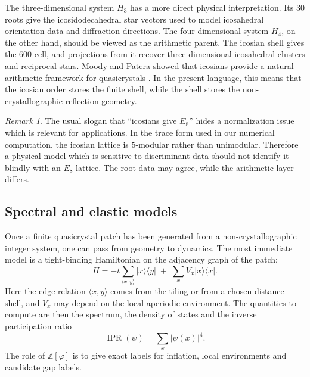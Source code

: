 \documentclass[12pt,oneside,english]{amsart}
\numberwithin{equation}{section}
\numberwithin{figure}{section}
\numberwithin{table}{section}
\theoremstyle{plain}
\theoremstyle{definition}
\theoremstyle{remark}
\newtheorem{remark}[theorem]{Remark}
\newcommand{\Zphi}{\mathbb Z[\varphi]}
\begin{document}
The three-dimensional system \(H_3\) has a more direct physical interpretation. Its \(30\) roots give the icosidodecahedral star vectors used to model icosahedral orientation data and diffraction directions. The four-dimensional system \(H_4\), on the other hand, should be viewed as the arithmetic parent. The icosian shell gives the \(600\)-cell, and projections from it recover three-dimensional icosahedral clusters and reciprocal stars. Moody and Patera showed that icosians provide a natural arithmetic framework for quasicrystals \cite{Icosians}. In the present language, this means that the icosian order stores the finite shell, while the shell stores the non-crystallographic reflection geometry.

\begin{remark}
The usual slogan that ``icosians give \(E_8\)'' hides a normalization issue which is relevant for applications. In the trace form used in our numerical computation, the icosian lattice is \(5\)-modular rather than unimodular. Therefore a physical model which is sensitive to discriminant data should not identify it blindly with an \(E_8\) lattice. The root data may agree, while the arithmetic layer differs.
\end{remark}

\subsection{Spectral and elastic models}

Once a finite quasicrystal patch has been generated from a non-crystallographic integer system, one can pass from geometry to dynamics. The most immediate model is a tight-binding Hamiltonian on the adjacency graph of the patch:
\begin{equation}
H=-t\sum_{\langle x,y\rangle}|x\rangle\langle y|
\;+\;\sum_x V_x |x\rangle\langle x|.
\label{eq:tight-binding}
\end{equation}
Here the edge relation \(\langle x,y\rangle\) comes from the tiling or from a chosen distance shell, and \(V_x\) may depend on the local aperiodic environment. The quantities to compute are then the spectrum, the density of states and the inverse participation ratio
\begin{equation}
\operatorname{IPR}(\psi)=\sum_x|\psi(x)|^4.
\label{eq:ipr}
\end{equation}
The role of \(\Zphi\) is to give exact labels for inflation, local environments and candidate gap labels.
\end{document}
